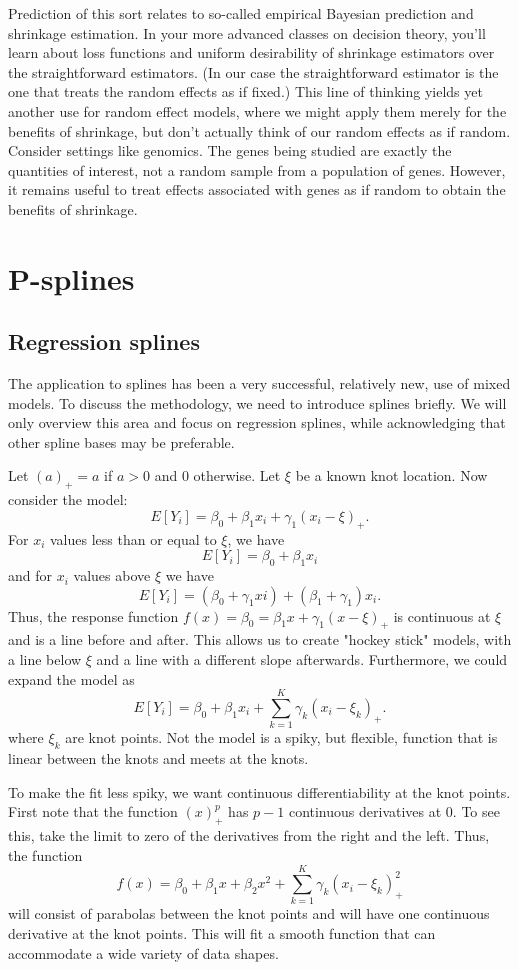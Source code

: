 Prediction of this sort relates to so-called empirical Bayesian prediction 
and shrinkage estimation. In your more advanced classes on decision theory,
you'll learn about loss functions and uniform desirability of shrinkage
estimators over the straightforward estimators. (In our case the straightforward
estimator is the one that treats the random
effects as if fixed.) This line of thinking yields yet another use for random effect models, where
we might apply them merely for the benefits of shrinkage,
but don't actually think of our random effects as if random. Consider
settings like genomics. The genes being studied are exactly the quantities
of interest, not a random sample from a population of genes. However, it
remains useful to treat effects associated with genes as if random to 
obtain the benefits of shrinkage.


\section{P-splines}

\subsection{Regression splines}
The application to splines has been a very successful, relatively new, use of 
mixed models. To discuss the methodology, we need to introduce splines briefly.
We will only overview this area and focus on regression splines, while acknowledging
that other spline bases may be preferable. 

Let $(a)_+ = a$ if $a > 0$ and $0$ otherwise. Let $\xi$ be a known
knot location. Now consider the model:
$$
E[Y_i] = \beta_0 + \beta_1 x_i + \gamma_1 (x_i - \xi)_+.
$$
For $x_i$ values less than or equal to $\xi$, we have 
$$
E[Y_i] = \beta_0 + \beta_1 x_i
$$
and for $x_i$ values above $\xi$ we have
$$
E[Y_i] = (\beta_0 + \gamma_1 xi) + (\beta_1 + \gamma_1) x_i.
$$
Thus, the response function $f(x) = \beta_0 = \beta_1 x + \gamma_1 (x - \xi)_+$
is continuous at $\xi$ and is a line before and after. This allows us to create
"hockey stick" models, with a line below $\xi$ and a line with a different slope
afterwards. Furthermore, we could expand the model as 
$$
E[Y_i] = \beta_0 + \beta_1 x_i + \sum_{k=1}^K \gamma_k (x_i - \xi_k)_+.
$$
where $\xi_k$ are knot points. Not the model is a spiky, but flexible, 
function that is linear between the knots and meets at the knots.

To make the fit less spiky, we want continuous differentiability at the knot
points. First note that the function $(x)_+^p$ has $p-1$ continuous derivatives at 0. 
To see this, take the limit to zero 
of the derivatives from the right and the left. Thus, the function
$$
f(x) = \beta_0 + \beta_1 x + \beta_2 x^2 + \sum_{k=1}^K \gamma_k (x_i - \xi_k)_+^2
$$
will consist of parabolas between the knot points and
will have one continuous derivative at the knot points. This will fit 
a smooth function that can accommodate a wide variety of data shapes. 


